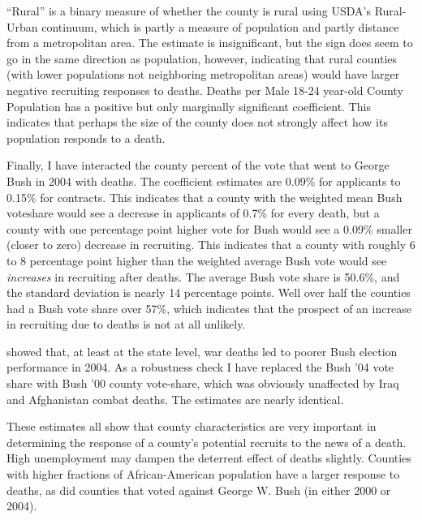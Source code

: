 \documentclass[12pt] {article}
\begin{document}
``Rural'' is a binary measure of whether the county is rural using USDA's Rural-Urban continuum, which is partly a measure of population and partly distance from a metropolitan area. The estimate is insignificant, but the sign does seem to go in the same direction as population, however, indicating that rural counties
(with lower populations not neighboring metropolitan areas) would have larger negative recruiting responses to deaths. Deaths per Male 18-24 year-old County Population has a positive but only marginally significant coefficient. This indicates that perhaps the size of the county does not strongly affect how its population responds to a death. %

Finally, I have interacted the county percent of the vote that went
to George Bush in 2004 with deaths. The coefficient estimates are 0.09\% for applicants to 0.15\% for contracts. This indicates that a county with the weighted mean Bush voteshare would see a decrease in applicants of 0.7\% for every death, but a county with one percentage point higher vote for Bush would see a 0.09\% smaller (closer
to zero) decrease in recruiting. This indicates that a county with
roughly 6 to 8 percentage point higher than the weighted average Bush
vote would see \textit{increases} in recruiting after deaths. The average Bush
vote share is 50.6\%, and the standard deviation is nearly 14 percentage
points. Well over half the counties had a Bush vote share over 57\%, which indicates that the prospect of an increase in recruiting due to deaths is not at all unlikely.

\cite{Ted-Miguel-Bush-Deaths} showed that, at least at the state
level, war deaths led to poorer Bush election performance in 2004.
As a robustness check I have replaced the Bush '04 vote share with
Bush '00 county vote-share, which was obviously unaffected by Iraq
and Afghanistan combat deaths. The estimates are nearly identical. 

These estimates all show that county characteristics are very important
in determining the response of a county's potential recruits to the
news of a death. High unemployment may dampen the deterrent effect of deaths slightly.
Counties with higher fractions of African-American population have
a larger response to deaths, as did counties that voted against George
W. Bush (in either 2000 or 2004).


\end{document}

